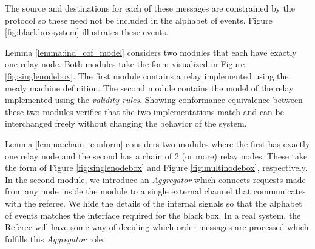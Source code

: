 \documentclass[runningheads]{llncs}
\begin{document}
The source and destinations for each of these messages are constrained by the protocol so these need not be included in the alphabet of events. Figure \ref{fig:blackboxsystem} illustrates these events.

Lemma \ref{lemma:ind_cof_model} considers two modules that each have exactly one relay node. Both modules take the form visualized in Figure \ref{fig:singlenodebox}. The first module contains a relay implemented using the mealy machine definition. The second module contains the model of the relay implemented using the \emph{validity rules}. Showing conformance equivalence between these two modules verifies that the two implementations match and can be interchanged freely without changing the behavior of the system. 

Lemma \ref{lemma:chain_conform} considers two modules where the first has exactly one relay node and the second has a chain of 2 (or more) relay nodes. These take the form of Figure \ref{fig:singlenodebox} and Figure \ref{fig:multinodebox}, respectively. In the second module, we introduce an \emph{Aggregator} which connects requests made from any node inside the module to a single external channel that communicates with the referee. We hide the details of the internal signals so that the alphabet of events matches the interface required for the black box. In a real system, the Referee will have some way of deciding which order messages are processed which fulfills this \emph{Aggregator} role. 
\end{document}

